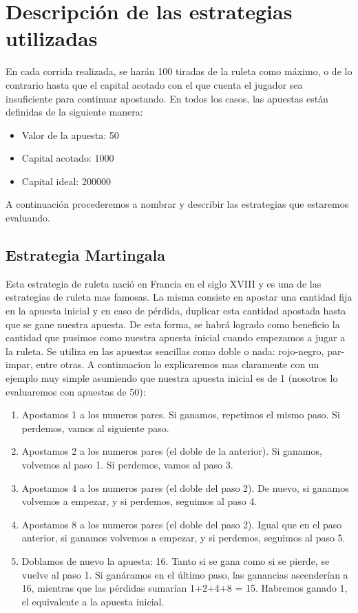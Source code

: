 \documentclass{article}
\begin{document}
\section{Descripción de las estrategias utilizadas}
\label{sec:headings}
En cada corrida realizada, se harán 100 tiradas de la ruleta como máximo, o de lo contrario hasta que el capital acotado con el que cuenta el jugador sea insuficiente para continuar apostando. En todos los casos, las apuestas están definidas de la siguiente manera:
\begin{itemize}
\item Valor de la apuesta: 50
\end{itemize}
\begin{itemize}
\item Capital acotado: 1000
\end{itemize}
\begin{itemize}
\item Capital ideal: 200000
\end{itemize}
A continuación procederemos a nombrar y describir las estrategias que estaremos evaluando.

\subsection{Estrategia Martingala}
Esta estrategia de ruleta nació en Francia en el siglo XVIII y es una de las estrategias de ruleta mas famosas. La misma consiste en apostar una cantidad fija en la apuesta inicial y en caso de pérdida, duplicar esta cantidad apostada hasta que se gane nuestra apuesta. De esta forma, se habrá logrado como beneficio la cantidad que pusimos como nuestra apuesta inicial cuando empezamos a jugar a la ruleta. Se utiliza en las apuestas sencillas como doble o nada: rojo-negro, par-impar, entre otras. A continuacion lo explicaremos mas claramente con un ejemplo muy simple asumiendo que nuestra apuesta inicial es de 1 (nosotros lo evaluaremos con apuestas de 50):\\

\begin{enumerate}
\item  Apostamos 1 a los numeros pares. Si ganamos, repetimos el mismo paso. Si perdemos, vamos al siguiente paso.
\item  Apostamos 2 a los numeros pares (el doble de la anterior). Si ganamos, volvemos al paso 1. Si perdemos, vamos al paso 3.
\item  Apostamos 4 a los numeros pares (el doble del paso 2). De nuevo, si ganamos volvemos a empezar, y si perdemos, seguimos al paso 4.
\item Apostamos 8 a los numeros pares (el doble del paso 2). Igual que en el paso anterior, si ganamos volvemos a empezar, y si perdemos, seguimos al paso 5.
\item Doblamos de nuevo la apuesta: 16. Tanto si se gana como si se pierde, se vuelve al paso 1. Si ganáramos en el último paso, las ganancias ascenderían a 16, mientras que las pérdidas sumarían 1+2+4+8 = 15. Habremos ganado 1, el equivalente a la apuesta inicial.
\end{enumerate}
\end{document}
